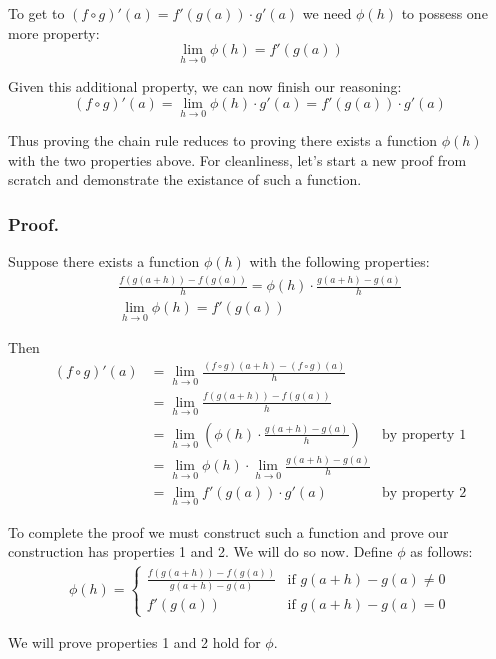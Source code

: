 To get to $(f\circ g)'(a)=f'(g(a))\cdot g'(a)$ we need $\phi(h)$ to possess one
more property:
\[\lim_{h\to0}\phi(h)=f'(g(a))\]

Given this additional property, we can now finish our reasoning:
\[(f\circ g)'(a)=\lim_{h\to0}\phi(h)\cdot g'(a)=f'(g(a))\cdot g'(a)\]

Thus proving the chain rule reduces to proving there exists a function
$\phi(h)$ with the two properties above. For cleanliness, let's start a
new proof from scratch and demonstrate the existance of such a
function.

\subsubsection*{Proof.}

Suppose there exists a function $\phi(h)$ with the
following properties:
\setcounter{equation}{0}
\begin{gather}
\frac{f(g(a+h))-f(g(a))}{h}=\phi(h)\cdot\frac{g(a+h)-g(a)}{h}\\
\lim_{h\to0}\phi(h)=f'(g(a))
\end{gather}

Then
\begin{align*}
  (f\circ g)'(a)&=\lim_{h\to0}\frac{(f\circ g)(a+h)-(f\circ g)(a)}{h}\\
            &=\lim_{h\to0}\frac{f(g(a+h))-f(g(a))}{h}\\
            &=\lim_{h\to0}\left(\phi(h)\cdot\frac{g(a+h)-g(a)}{h}\right)&\text{by
                                                                 property
                                                                 1}\\
            &=\lim_{h\to0}\phi(h)\cdot\lim_{h\to0}\frac{g(a+h)-g(a)}{h}\\
            &=\lim_{h\to0}f'(g(a))\cdot g'(a)&\text{by property 2}
\end{align*}

To complete the proof we must construct such a function and prove our
construction has properties 1 and 2. We will do so now. Define $\phi$ as
follows:
\begin{align*}
  \phi(h)=\begin{cases}
    \frac{f(g(a+h))-f(g(a))}{g(a+h)-g(a)} & \text{if } g(a+h)-g(a)\neq0 \\
    f'(g(a))  & \text{if } g(a+h)-g(a)=0
\end{cases}
\end{align*}

We will prove properties 1 and 2 hold for $\phi$.


